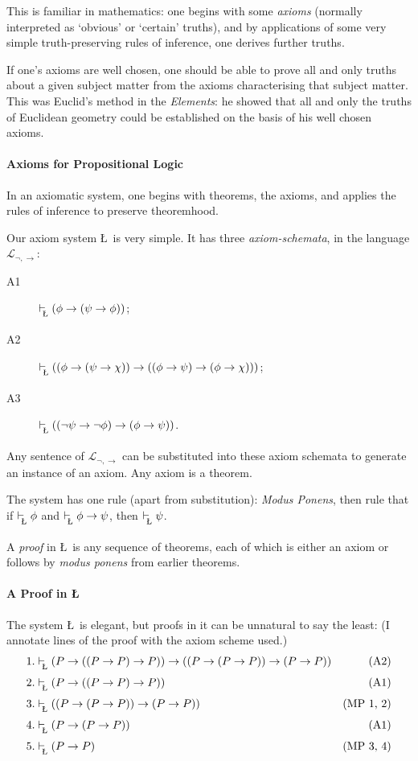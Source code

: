 {This is familiar in mathematics: one begins with some \emph{axioms} (normally interpreted as `obvious' or `certain' truths), and by applications of some very simple truth-preserving rules of inference, one derives further truths.

If one's axioms are well chosen, one should be able to prove all and only truths about a given subject matter from the axioms characterising that subject matter. This was Euclid's method in the \emph{Elements}: he showed that all and only the truths of Euclidean geometry could be established on the basis of his well chosen axioms.

\paragraph{Axioms for Propositional Logic}

In an axiomatic system, one begins with theorems, the axioms, and applies the rules of inference to preserve theoremhood. 

Our axiom system \L\ is very simple. It has three \emph{axiom-schemata}, in the language $\mathcal{L}_{\neg,\to}$:
\begin{description}
	\item [A1] $\lvdash (\phi \to (\psi \to \phi))$;
	\item [A2]$\lvdash ((\phi \to (\psi \to \chi)) \to ((\phi \to \psi) \to (\phi \to \chi)))$;
	\item [A3] $\lvdash ((\neg \psi \to \neg \phi) \to (\phi \to \psi))$.
\end{description}
Any sentence of $\mathcal{L}_{\neg,\to}$ can be substituted into these axiom schemata to generate an instance of an axiom. Any axiom is a theorem.

The system has one rule (apart from substitution): \emph{\emph{Modus Ponens}}, then rule that if $\lvdash \phi$ and $\lvdash \phi\to\psi$, then $\lvdash\psi$. 

A \emph{proof} in \L\ is any sequence of theorems, each of which is either an axiom or follows by \emph{modus ponens} from earlier theorems.

\paragraph{A Proof in \L}

The system \L\ is  elegant, but proofs in it can be unnatural to say the least: (I annotate lines of the proof with the axiom scheme used.)
\begin{align*}
 1. &\lvdash (P\to((P\to P)\to P)) \to ((P\to(P\to P))\to(P\to P)) & \text{(A2)}\\
2. &\lvdash (P\to((P\to P)\to P)) &\text{(A1)}\\
3. &\lvdash ((P\to(P\to P))\to(P\to P)) &\text{(MP 1, 2)}\\
4. &\lvdash (P \to (P\to P)) & \text{(A1)}\\
5. &\lvdash (P\to P)&\text{(MP 3, 4)}
\end{align*} 

}
